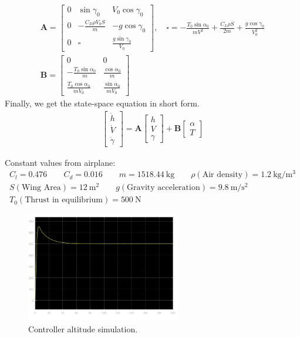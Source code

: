 \documentclass[english,palatino]{ist-report}
\begin{document}
\begin{gather}
	\label{eq:a_matrix}
	\mathbf{A} = \left[\begin{matrix}
			0	& \sin\gamma_0				& V_0\cos\gamma_0								\\
			0	& -\frac{C_D\rho V_0S}{m}	& -g\cos\gamma_0								\\
			0	& \square					& \frac{g\sin\gamma_0}{V_0}
		\end{matrix}\right],
		\quad
		\square = -\frac{T_0\sin\alpha_0}{mV^2} + \frac{C_L\rho S}{2m} + \frac{g\cos\gamma_0}{V_0^2} \\
	\label{eq:b_matrix}
	\mathbf{B} = \left[\begin{matrix}
			0								& 0							\\
			-\frac{T_0\sin\alpha_0}{m}		& \frac{\cos\alpha_0}{m}	\\
			\frac{T_0\cos\alpha_0}{mV_0}	& \frac{\sin\alpha_0}{mV_0}
		\end{matrix}\right]
\end{gather}
Finally, we get the state-space equation in short form.
\begin{gather}\label{eq:statespace}
	\left[\begin{matrix} \dot{h} \\ \dot{V} \\ \dot{\gamma} \end{matrix}\right] = \mathbf{A}\left[\begin{matrix} h \\ V \\ \gamma \end{matrix}\right] + \mathbf{B}\left[\begin{matrix} \alpha \\ T \end{matrix}\right]
\end{gather}


Constant values from airplane:
\begin{gather*}
C_l = 0.476 \qquad
C_d = 0.016 \qquad
m = \SI{1518.44}{\kilogram} \qquad
\rho (\textrm{Air density}) = \SI{1.2}{\kilogram\per\meter\cubed} \\
S (\textrm{Wing Area}) = \SI{12}{\meter\squared} \qquad
g (\textrm{Gravity acceleration}) = \SI{9.8}{\meter\per\second\squared} \\
T_0 (\textrm{Thrust in equilibrium}) = \SI{500}{\newton}
\end{gather*}

\begin{figure}
	\centering
	\includegraphics[width=0.6\textwidth]{graphics/hsim.jpg}
	\caption{Controller altitude simulation.}
	\label{fig:bodyref}
\end{figure}
\end{document}
